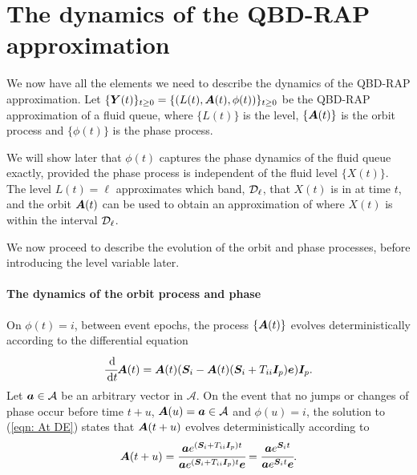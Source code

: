\section{The dynamics of the QBD-RAP approximation}\label{sec: dynamics}
We now have all the elements we need to describe the dynamics of the QBD-RAP approximation. Let \(\{\boldsymbol Y(t)\}_{t\geq0} = \{(L(t),\boldsymbol A(t),\phi(t))\}_{t\geq0}\) be the QBD-RAP approximation of a fluid queue, where \(\{L(t)\}\) is the level, \(\{\boldsymbol A(t)\}\) is the orbit process and \(\{\phi(t)\}\) is the phase process.  

We will show later that \(\phi(t)\) captures the phase dynamics of the fluid queue exactly, provided the phase process is independent of the fluid level \(\{X(t)\}\). The level \(L(t)=\ell\) approximates which band, \(\mathcal{D}_\ell\), that \(X(t)\) is in at time \(t\), and the orbit \(\boldsymbol A(t)\) can be used to obtain an approximation of where \(X(t)\) is within the interval \(\mathcal{D}_\ell\). 

We now proceed to describe the evolution of the orbit and phase processes, before introducing the level variable later. 

\paragraph{The dynamics of the orbit process and phase} On \({\phi}(t)=i\), between event epochs, the process \(\{\boldsymbol A(t)\}\) evolves deterministically according to the differential equation 
\begin{align}\label{eqn: At DE}
\cfrac{\, \mathrm{d}}{\, \mathrm{d} t}\boldsymbol A(t) = \boldsymbol A(t)(\boldsymbol{S}_i - \boldsymbol A(t) (\boldsymbol{S}_i + T_{ii}\boldsymbol{I}_p)\boldsymbol e)\boldsymbol{I}_p.
\end{align}
Let \(\boldsymbol a \in{}\mathcal A\) be an arbitrary vector in \(\mathcal A\). On the event that no jumps or changes of phase occur before time \(t+u\), \(\boldsymbol A(u) = \boldsymbol a\in\mathcal A\) and \({\phi}(u)=i\), the solution to (\ref{eqn: At DE}) states that \(\boldsymbol A({t+u})\) evolves deterministically according to 
\[\boldsymbol A({t+u}) =  \cfrac{\boldsymbol a e^{(\boldsymbol{S}_i+T_{ii}\boldsymbol{I}_p)t}}{\boldsymbol a e^{(\boldsymbol{S}_i+T_{ii}\boldsymbol{I}_p)t} \boldsymbol e} = \cfrac{\boldsymbol a e^{\boldsymbol{S}_i t}}{\boldsymbol a e^{\boldsymbol{S}_i t} \boldsymbol e}.\] 

